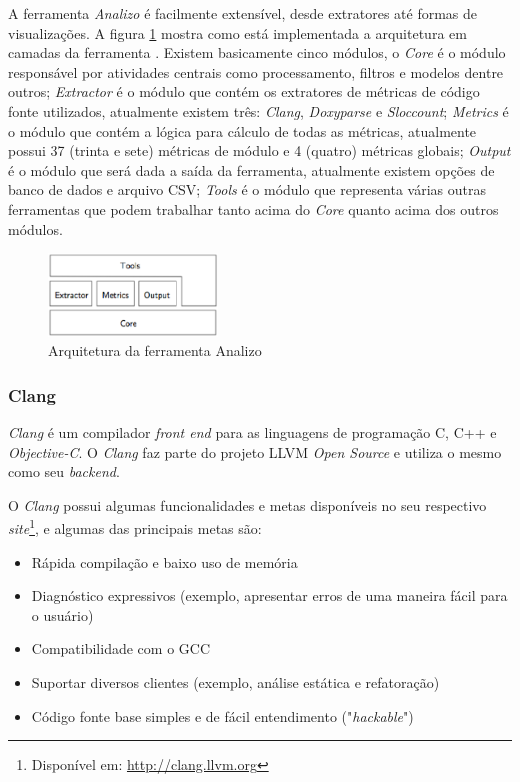 A ferramenta \emph{Analizo} é facilmente extensível, desde extratores até formas
de visualizações. A figura \ref{archanalizo} mostra
como está implementada a arquitetura em camadas da ferramenta \cite{analizoartigo}. Existem basicamente cinco módulos, o 
\textit{Core} é o módulo responsável por atividades centrais como processamento,
filtros e modelos dentre outros; 
\textit{Extractor} é o módulo que contém os extratores de métricas de código
fonte utilizados, atualmente existem três: \textit{Clang}, \textit{Doxyparse}
e \textit{Sloccount}; \textit{Metrics} é o módulo que contém a lógica para
cálculo de todas as métricas, atualmente possui
37 (trinta e sete) métricas de módulo e 4 (quatro) métricas globais; \textit{Output} é o módulo que será dada a saída da 
ferramenta, atualmente existem opções de banco de dados e arquivo CSV; \textit{Tools} é o módulo que representa várias outras
ferramentas que podem trabalhar tanto acima do \textit{Core} quanto acima dos outros módulos.

\begin{figure}[h]
  \centering
  \includegraphics[width=0.4\textwidth]
      {figuras/analizo.eps}
  \caption{Arquitetura da ferramenta Analizo}
  \label{archanalizo}
\end{figure}

\subsubsection{Clang} \label{clang}

\emph{Clang} é um compilador \textit{front end} para as linguagens de
programação C, C++ e \textit{Objective-C}. O \emph{Clang} faz parte
do projeto LLVM \textit{Open Source} e utiliza o mesmo como seu \textit{backend}. 

O \emph{Clang} possui algumas funcionalidades e metas disponíveis no seu respectivo
\textit{site}\footnote{Disponível em: \url{http://clang.llvm.org}}, e
algumas das principais metas são:

\begin{itemize}
  \item Rápida compilação e baixo uso de memória
  \item Diagnóstico expressivos (exemplo, apresentar erros de uma maneira fácil para o usuário)
  \item Compatibilidade com o GCC
  \item Suportar diversos clientes (exemplo, análise estática e refatoração)
  \item Código fonte base simples e de fácil entendimento ("\textit{hackable}")
\end{itemize}

